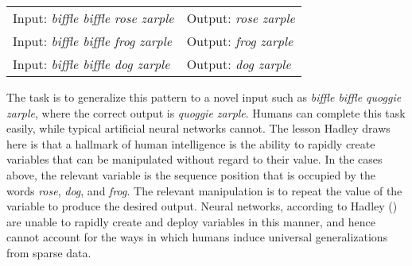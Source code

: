 \vskip 0.12in
\begin{tabular}{l l} 
Input: \textit{biffle biffle rose zarple}  & Output: \textit{rose zarple} \\
Input: \textit{biffle biffle frog zarple } & Output: \textit{frog zarple} \\
Input: \textit{biffle biffle dog zarple} & Output: \textit{dog zarple} \\
\end{tabular} 
\vskip 0.12in

\noindent
The task is to generalize this pattern to a novel input such as \textit{biffle biffle quoggie zarple}, where the correct output is \textit{quoggie zarple}. Humans can complete this task easily, while typical artificial neural networks cannot. The lesson Hadley draws here is that a hallmark of human intelligence is the ability to rapidly create variables that can be manipulated without regard to their value. In the cases above, the relevant variable is the sequence position that is occupied by the words \textit{rose}, \textit{dog}, and \textit{frog}. The relevant manipulation is to repeat the value of the variable to produce the desired output. Neural networks, according to Hadley (\citeyear{Hadley:2009}) are unable to rapidly create and deploy variables in this manner, and hence cannot account for the ways in which humans induce universal generalizations from sparse data.


